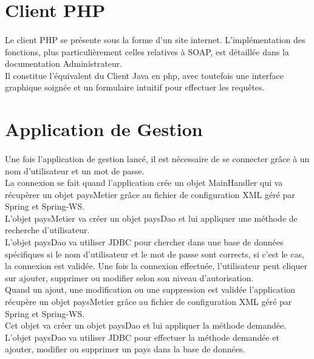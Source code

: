 \section{Client PHP}
\paragraph{} Le client PHP se présente sous la forme d'un site internet. L'implémentation des fonctions, plus particulièrement celles relatives à SOAP, est détaillée dans la documentation Administrateur. \\
Il constitue l'équivalent du Client Java en php, avec toutefois une interface graphique soignée et un formulaire intuitif pour effectuer les requêtes.

\section{Application de Gestion}
\paragraph{} Une fois l'application de gestion lancé, il est nécessaire de se connecter grâce à un nom d'utilisateur et un mot de passe.\\
La connexion se fait quand l'application crée un objet MainHandler qui va récupèrer un objet paysMetier grâce au fichier de configuration XML géré par Spring et Spring-WS.\\
L'objet paysMetier va créer un objet paysDao et lui appliquer une méthode de recherche d'utilisateur.\\
L'objet paysDao va utiliser JDBC pour chercher dans une base de données spécifiques si le nom d'utilisateur et le mot de passe sont corrects, si c'est le cas, la connexion est validée.
Une fois la connexion effectuée, l'utilisateur peut cliquer sur ajouter, supprimer ou modifier selon son niveau d'autorisation.\\
Quand un ajout, une modification ou une suppression est validée l'application récupère un objet paysMetier grâce au fichier de configuration XML géré par Spring et Spring-WS.\\
Cet objet va créer un objet paysDao et lui appliquer la méthode demandée.\\
L'objet paysDao va utiliser JDBC pour effectuer la méthode demandée et ajouter, modifier ou supprimer un pays dans la base de données.\\


\newpage

